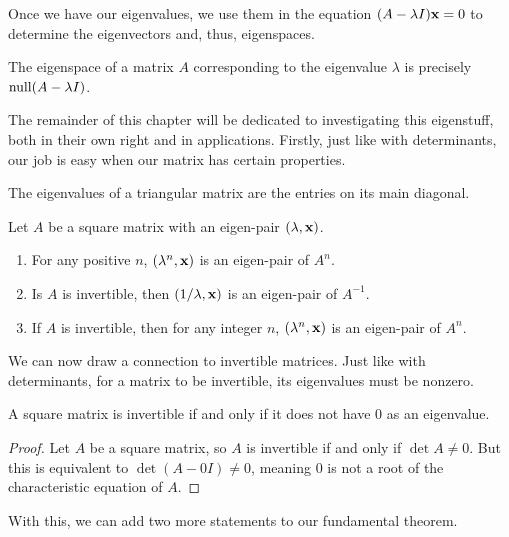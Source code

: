 \documentclass[../m073main.tex]{subfiles}
\begin{document}
Once we have our eigenvalues, we use them in the equation $(A - \lambda I) \mathbf{x} = 0$ to determine the eigenvectors and, thus, eigenspaces.

\begin{theorem}
	The eigenspace of a matrix $A$ corresponding to the eigenvalue $\lambda$ is precisely $\operatorname{null} (A - \lambda I)$.
\end{theorem}

The remainder of this chapter will be dedicated to investigating this eigenstuff, both in their own right and in applications.
Firstly, just like with determinants, our job is easy when our matrix has certain properties.

\begin{theorem}
	The eigenvalues of a triangular matrix are the entries on its main diagonal.
\end{theorem}

\begin{theorem}
	Let $A$ be a square matrix with an eigen-pair $(\lambda, \mathbf{x})$.
	\begin{enumerate}[label=(\alph*)]
		\item For any positive $n$, $(\lambda^n, \mathbf{x})$ is an eigen-pair of $A^n$.
		\item Is $A$ is invertible, then $(1/\lambda, \mathbf{x})$ is an eigen-pair of $A^{-1}$.
		\item If $A$ is invertible, then for any integer $n$, $(\lambda^n, \mathbf{x})$ is an eigen-pair of $A^n$.
	\end{enumerate}
\end{theorem}

We can now draw a connection to invertible matrices.
Just like with determinants, for a matrix to be invertible, its eigenvalues must be nonzero.

\begin{theorem}
	A square matrix is invertible if and only if it does not have 0 as an eigenvalue.
\end{theorem}

\begin{proof}
	Let $A$ be a square matrix, so $A$ is invertible if and only if $\det A \neq 0$.
	But this is equivalent to $\det (A - 0I) \neq 0$, meaning 0 is not a root of the characteristic equation of $A$.
\end{proof}

With this, we can add two more statements to our fundamental theorem.
\end{document}
